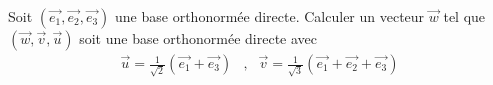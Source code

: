 Soit $(\overrightarrow{e_1},\overrightarrow{e_2},\overrightarrow{e_3})$ une base orthonorm\'ee directe. Calculer un vecteur $\overrightarrow{w}$ tel que $(\overrightarrow{w},\overrightarrow{v},\overrightarrow{u})$ soit une base orthonorm\'ee directe avec
\begin{align*}
 \overrightarrow{u}=\frac{1}{\sqrt{2}}(\overrightarrow{e_1}+\overrightarrow{e_3}) &,& 
 \overrightarrow{v}=\frac{1}{\sqrt{3}}(\overrightarrow{e_1}+\overrightarrow{e_2}+\overrightarrow{e_3})
\end{align*}
\medskip
